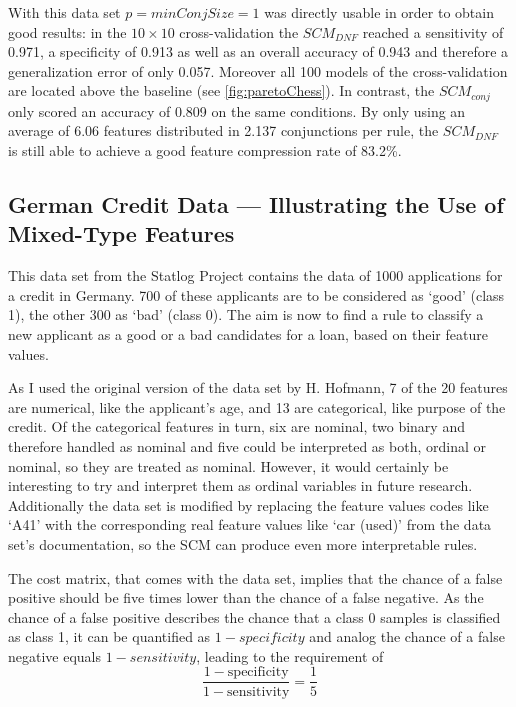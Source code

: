 With this data set \(p = minConjSize = 1\) was directly usable in order to
obtain good results: in the \(10 \times 10\) cross-validation the \(SCM_{DNF}\) reached a sensitivity of 0.971, a specificity of 0.913
as well as an overall accuracy of 0.943 and therefore a generalization error of only 0.057.
Moreover all 100 models of the cross-validation are located above the baseline (see \autoref{fig:paretoChess}).
In contrast, the \(SCM_{conj}\) only scored an accuracy of 0.809 on the same conditions.
By only using an average of 6.06 features distributed in 2.137 conjunctions per rule, the \(SCM_{DNF}\) is still able to achieve
a good feature compression rate of 83.2\%.

\subsection{German Credit Data --- Illustrating the Use of Mixed-Type Features}\label{subsec:german}

This data set from the Statlog Project contains the data of 1000 applications for a credit in Germany.
700 of these applicants are to be considered as `good' (class 1), the other 300 as `bad' (class 0).
The aim is now to find a rule to classify a new applicant as a good or a bad candidates for a loan, based on their feature values.

As I used the original version of the data set by H. Hofmann, 7 of the 20 features are numerical, like the applicant's age, and 13 are categorical, like purpose of the credit.
Of the categorical features in turn, six are nominal, two binary and therefore handled as nominal and five could be
interpreted as both, ordinal or nominal, so they are treated as nominal.
However, it would certainly be interesting to try and interpret them as ordinal variables in future research.
Additionally the data set is modified by replacing the feature values codes like `A41' with the corresponding real feature values like `car (used)'
from the data set's documentation, so the SCM can produce even more interpretable rules.

The cost matrix, that comes with the data set, implies that the chance of a false positive should be five times lower than the chance of a false negative.
As the chance of a false positive describes the chance that a class 0 samples is classified as class 1, it can be quantified as \(1 - specificity\)
and analog the chance of a false negative equals \(1 - sensitivity\), leading to the requirement of
\[\frac{1-\text{specificity}}{1-\text{sensitivity}} = \frac{1}{5}\]

